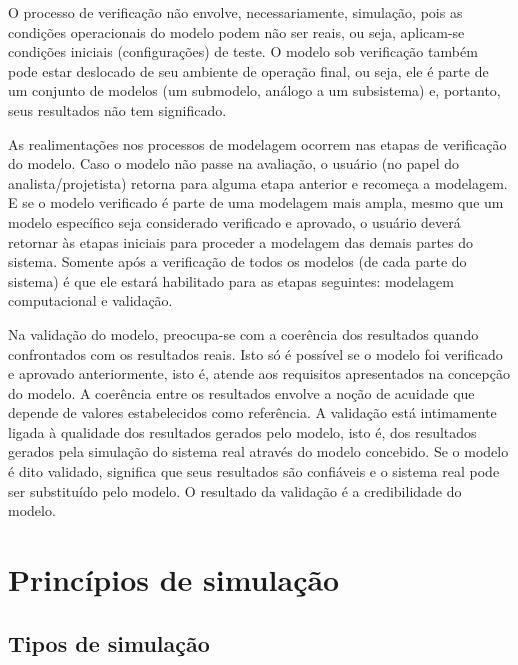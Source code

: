 \documentclass[a4paper,12pt,oneside,onecolumn]{uerj}
\begin{document}
O processo de verificação não envolve, necessariamente, simulação, pois as condições operacionais do modelo podem não ser reais, ou seja, aplicam-se condições iniciais (configurações) de teste. O modelo sob verificação também pode estar deslocado de seu ambiente de operação final, ou seja, ele é parte de um conjunto de modelos (um submodelo, análogo a um subsistema) e, portanto, seus resultados não tem significado. 

As realimentações nos processos de modelagem ocorrem nas etapas de verificação do modelo. Caso o modelo não passe na avaliação, o usuário (no papel do analista/projetista) retorna para alguma etapa anterior e recomeça a modelagem. E se o modelo verificado é parte de uma modelagem mais ampla, mesmo que um modelo específico seja considerado verificado e aprovado, o usuário deverá retornar às etapas iniciais para proceder a modelagem das demais partes do sistema. Somente após a verificação de todos os modelos (de cada parte do sistema) é que ele estará habilitado para as etapas seguintes: modelagem computacional e validação.

Na validação do modelo, preocupa-se com a coerência dos resultados quando confrontados com os resultados reais. Isto só é possível se o modelo foi verificado e aprovado anteriormente, isto é, atende aos requisitos apresentados na concepção do modelo. A coerência entre os resultados envolve a noção de acuidade que depende de valores estabelecidos como referência. A validação está intimamente ligada à qualidade dos resultados gerados pelo modelo, isto é, dos resultados gerados pela simulação do sistema real através do modelo concebido. Se o modelo é dito validado, significa que seus resultados são confiáveis e o sistema real pode ser substituído pelo modelo. O resultado da validação é a credibilidade do modelo.

\chapter{Princípios de simulação}

\section{Tipos de simulação}
\end{document}

